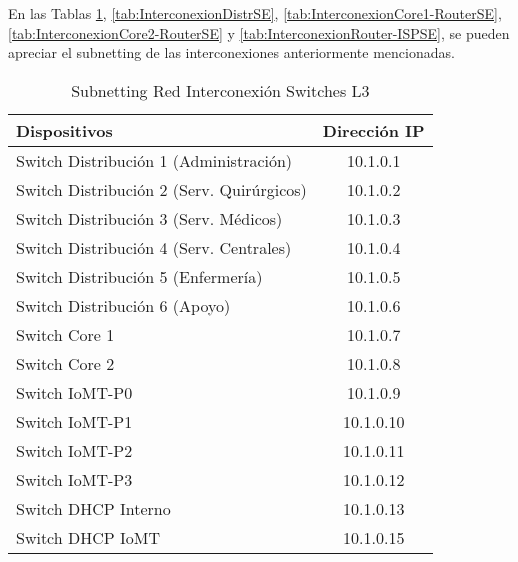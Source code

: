 En las Tablas \ref{tab:InterconexionCoreSE}, \ref{tab:InterconexionDistrSE}, \ref{tab:InterconexionCore1-RouterSE}, \ref{tab:InterconexionCore2-RouterSE} y \ref{tab:InterconexionRouter-ISPSE},
se pueden apreciar el subnetting de las interconexiones anteriormente mencionadas.
\renewcommand{\arraystretch}{1.5}
\begin{table}[H]
    \centering
    \scriptsize
    \begin{tabular}{|l|c|}
        \hline
        \textbf{Dispositivos} & \textbf{Dirección IP} \\
        \hline
        Switch Distribución 1 (Administración) & 10.1.0.1 \\
        \hline
        Switch Distribución 2 (Serv. Quirúrgicos) & 10.1.0.2 \\
        \hline
        Switch Distribución 3 (Serv. Médicos) & 10.1.0.3 \\
        \hline
        Switch Distribución 4 (Serv. Centrales) & 10.1.0.4 \\
        \hline
        Switch Distribución 5 (Enfermería) & 10.1.0.5 \\
        \hline
        Switch Distribución 6 (Apoyo) & 10.1.0.6 \\
        \hline
        Switch Core 1 & 10.1.0.7 \\
        \hline
        Switch Core 2 & 10.1.0.8 \\
        \hline
        Switch IoMT-P0 & 10.1.0.9 \\
        \hline
        Switch IoMT-P1 & 10.1.0.10 \\
        \hline
        Switch IoMT-P2 & 10.1.0.11 \\
        \hline
        Switch IoMT-P3 & 10.1.0.12 \\
        \hline
        Switch DHCP Interno & 10.1.0.13 \\
        \hline
        Switch DHCP IoMT & 10.1.0.15 \\
        \hline
    \end{tabular}
    \caption{Subnetting Red Interconexión Switches L3}
    \label{tab:InterconexionCoreSE}
\end{table}

